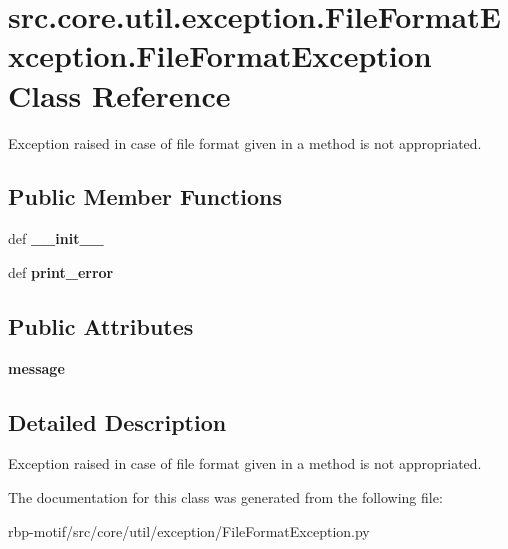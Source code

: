 \hypertarget{classsrc_1_1core_1_1util_1_1exception_1_1FileFormatException_1_1FileFormatException}{\section{src.\-core.\-util.\-exception.\-File\-Format\-Exception.\-File\-Format\-Exception Class Reference}
\label{classsrc_1_1core_1_1util_1_1exception_1_1FileFormatException_1_1FileFormatException}
}


Exception raised in case of file format given in a method is not appropriated.  


\subsection*{Public Member Functions}
\begin{DoxyCompactItemize}
\item 
\hypertarget{classsrc_1_1core_1_1util_1_1exception_1_1FileFormatException_1_1FileFormatException_a5cbad1b7a1ccf70256a3d18949ed2193}{def {\bfseries \-\_\-\-\_\-init\-\_\-\-\_\-}}\label{classsrc_1_1core_1_1util_1_1exception_1_1FileFormatException_1_1FileFormatException_a5cbad1b7a1ccf70256a3d18949ed2193}

\item 
\hypertarget{classsrc_1_1core_1_1util_1_1exception_1_1FileFormatException_1_1FileFormatException_a6601baad957387006ac24b21d02e8730}{def {\bfseries print\-\_\-error}}\label{classsrc_1_1core_1_1util_1_1exception_1_1FileFormatException_1_1FileFormatException_a6601baad957387006ac24b21d02e8730}

\end{DoxyCompactItemize}
\subsection*{Public Attributes}
\begin{DoxyCompactItemize}
\item 
\hypertarget{classsrc_1_1core_1_1util_1_1exception_1_1FileFormatException_1_1FileFormatException_a947a4fc6c58e82e619ab3a9c7e85a2e4}{{\bfseries message}}\label{classsrc_1_1core_1_1util_1_1exception_1_1FileFormatException_1_1FileFormatException_a947a4fc6c58e82e619ab3a9c7e85a2e4}

\end{DoxyCompactItemize}


\subsection{Detailed Description}
Exception raised in case of file format given in a method is not appropriated. 

The documentation for this class was generated from the following file\-:\begin{DoxyCompactItemize}
\item 
rbp-\/motif/src/core/util/exception/File\-Format\-Exception.\-py\end{DoxyCompactItemize}
